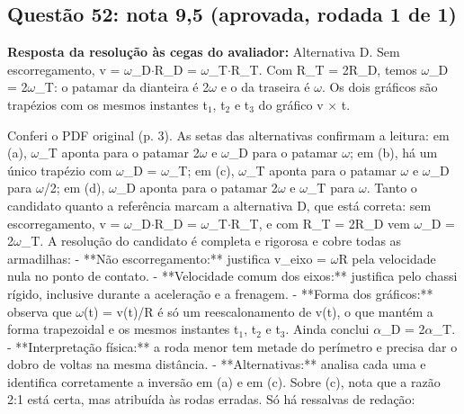 \documentclass{article}%
\begin{document}
\subsection*{Questão 52: nota 9,5 (aprovada, rodada 1 de 1)}%
\textbf{Resposta da resolução às cegas do avaliador:} Alternativa D. Sem escorregamento, v = $\omega$\_D$\cdot$R\_D = $\omega$\_T$\cdot$R\_T. Com R\_T = 2R\_D, temos $\omega$\_D = 2$\omega$\_T: o patamar da dianteira é 2$\omega$ e o da traseira é $\omega$. Os dois gráficos são trapézios com os mesmos instantes t$_{1}$, t$_{2}$ e t$_{3}$ do gráfico v $\times$ t.\par %
Conferi o PDF original (p. 3). As setas das alternativas confirmam a leitura: em (a), $\omega$\_T aponta para o patamar 2$\omega$ e $\omega$\_D para o patamar $\omega$; em (b), há um único trapézio com $\omega$\_D = $\omega$\_T; em (c), $\omega$\_T aponta para o patamar $\omega$ e $\omega$\_D para $\omega$/2; em (d), $\omega$\_D aponta para o patamar 2$\omega$ e $\omega$\_T para $\omega$. Tanto o candidato quanto a referência marcam a alternativa D, que está correta: sem escorregamento, v = $\omega$\_D$\cdot$R\_D = $\omega$\_T$\cdot$R\_T, e com R\_T = 2R\_D vem $\omega$\_D = 2$\omega$\_T.\newline%
\newline%
A resolução do candidato é completa e rigorosa e cobre todas as armadilhas:\newline%
{-} **Não escorregamento:** justifica v\_eixo = $\omega$R pela velocidade nula no ponto de contato.\newline%
{-} **Velocidade comum dos eixos:** justifica pelo chassi rígido, inclusive durante a aceleração e a frenagem.\newline%
{-} **Forma dos gráficos:** observa que $\omega$(t) = v(t)/R é só um reescalonamento de v(t), o que mantém a forma trapezoidal e os mesmos instantes t$_{1}$, t$_{2}$ e t$_{3}$. Ainda conclui $\alpha$\_D = 2$\alpha$\_T.\newline%
{-} **Interpretação física:** a roda menor tem metade do perímetro e precisa dar o dobro de voltas na mesma distância.\newline%
{-} **Alternativas:** analisa cada uma e identifica corretamente a inversão em (a) e em (c). Sobre (c), nota que a razão 2:1 está certa, mas atribuída às rodas erradas.\newline%
\newline%
Só há ressalvas de redação:\newline%
\end{document}
